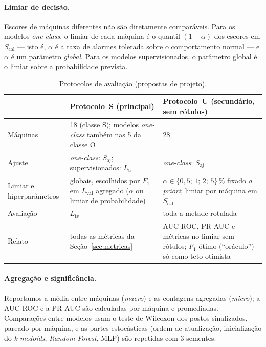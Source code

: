 \paragraph{Limiar de decisão.} Escores de máquinas diferentes não são diretamente comparáveis. Para os modelos
\emph{one-class}, o limiar de cada máquina é o quantil $(1-\alpha)$ dos escores em $S_{\mathrm{cal}}$ ---
isto é, $\alpha$ é a taxa de alarmes tolerada sobre o comportamento normal --- e $\alpha$ é um parâmetro
\emph{global}. Para os modelos supervisionados, o parâmetro global é o limiar sobre a probabilidade prevista.

\begin{table}[htbp]
\centering
\caption{Protocolos de avaliação (propostas de projeto).}
\label{tab:protocolos}
\small
\begin{tabularx}{\textwidth}{@{}lLL@{}}
\toprule
 & Protocolo~S (principal) & Protocolo~U (secundário, sem rótulos)\\
\midrule
Máquinas & 18 (classe S); modelos \emph{one-class} também nas 5 da classe O & 28\\
Ajuste & \emph{one-class}: $S_{\mathrm{aj}}$; supervisionados: $L_{\mathrm{tr}}$ & \emph{one-class}: $S_{\mathrm{aj}}$\\
Limiar e hiperparâmetros & globais, escolhidos por $F_1$ em $L_{\mathrm{val}}$ agregado ($\alpha$ ou limiar de probabilidade) & $\alpha\in\{0{,}5;\,1;\,2;\,5\}\,\%$ fixado \emph{a priori}; limiar por máquina em $S_{\mathrm{cal}}$\\
Avaliação & $L_{\mathrm{te}}$ & toda a metade rotulada\\
Relato & todas as métricas da Seção~\ref{sec:metricas} & AUC-ROC, PR-AUC e métricas no limiar sem rótulos; $F_1$ ótimo (``oráculo'') só como teto otimista\\
\bottomrule
\end{tabularx}
\end{table}

\paragraph{Agregação e significância.} Reportamos a média entre máquinas (\emph{macro}) e as contagens
agregadas (\emph{micro}); a AUC-ROC e a PR-AUC são calculadas por máquina e promediadas. Comparações entre
modelos usam o teste de Wilcoxon dos postos sinalizados, pareado por máquina, e as partes estocásticas (ordem de
atualização, inicialização do \emph{k-medoids}, \emph{Random Forest}, MLP) são repetidas com 3 sementes.

